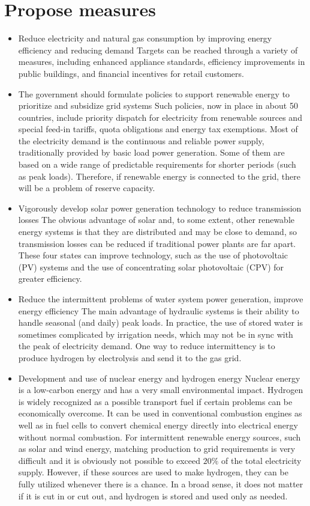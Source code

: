 \documentclass{mcmthesis}
\begin{document}
\section{Propose measures}
\begin{itemize}
  \item Reduce electricity and natural gas consumption by improving energy efficiency and reducing demand
        Targets can be reached through a variety of measures, including enhanced appliance standards,
        efficiency improvements in public buildings, and financial incentives for retail customers.
  \item The government should formulate policies to support renewable energy to prioritize and subsidize grid systems
  Such policies, now in place in about 50 countries, include priority dispatch for electricity from renewable sources and special feed-in tariffs, quota obligations and energy tax exemptions.
  Most of the electricity demand is the continuous and reliable power supply, traditionally provided by basic load power generation. Some of them are based on a wide range of predictable requirements for shorter periods (such as peak loads).
  Therefore, if renewable energy is connected to the grid, there will be a problem of reserve capacity.
  \item Vigorously develop solar power generation technology to reduce transmission losses
The obvious advantage of solar and, to some extent, other renewable energy systems is that they are distributed and may be close to demand, so transmission losses can be reduced if traditional power plants are far apart.
These four states can improve technology, such as the use of photovoltaic (PV) systems and the use of concentrating solar photovoltaic (CPV) for greater efficiency.
  \item Reduce the intermittent problems of water system power generation, improve energy efficiency
  The main advantage of hydraulic systems is their ability to handle seasonal (and daily) peak loads. In practice, the use of stored water is sometimes complicated by irrigation needs, which may not be in sync with the peak of electricity demand.
One way to reduce intermittency is to produce hydrogen by electrolysis and send it to the gas grid.
  \item Development and use of nuclear energy and hydrogen energy
  Nuclear energy is a low-carbon energy and has a very small environmental impact.
Hydrogen is widely recognized as a possible transport fuel if certain problems can be economically overcome.
It can be used in conventional combustion engines as well as in fuel cells to convert chemical energy directly into electrical energy without normal combustion.
For intermittent renewable energy sources, such as solar and wind energy,
matching production to grid requirements is very difficult and it is obviously not possible to exceed $20\%$ of the total electricity supply.
However, if these sources are used to make hydrogen, they can be fully utilized whenever there is a chance.
In a broad sense, it does not matter if it is cut in or cut out, and hydrogen is stored and used only as needed.
\end{itemize}
\end{document}
